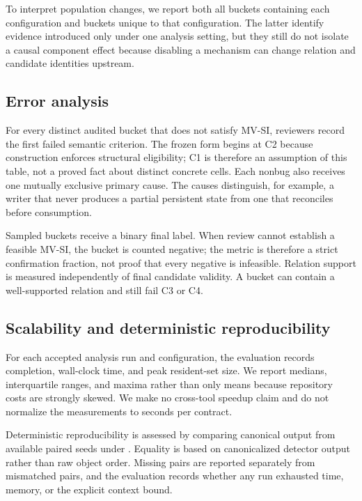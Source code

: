 To interpret population changes, we report both all buckets containing each configuration and buckets unique to that configuration. The latter identify evidence introduced only under one analysis setting, but they still do not isolate a causal component effect because disabling a mechanism can change relation and candidate identities upstream.

\subsection{Error analysis}
\label{s:evaluation-error-protocol}

For every distinct audited bucket that does not satisfy MV-SI, reviewers record the first failed semantic criterion. The frozen form begins at C2 because construction enforces structural eligibility; C1 is therefore an assumption of this table, not a proved fact about distinct concrete cells. Each nonbug also receives one mutually exclusive primary cause. The causes distinguish, for example, a writer that never produces a partial persistent state from one that reconciles before consumption.

Sampled buckets receive a binary final label. When review cannot establish a feasible MV-SI, the bucket is counted negative; the metric is therefore a strict confirmation fraction, not proof that every negative is infeasible. Relation support is measured independently of final candidate validity. A bucket can contain a well-supported relation and still fail C3 or C4.

\subsection{Scalability and deterministic reproducibility}
\label{s:evaluation-performance-protocol}

For each accepted analysis run and configuration, the evaluation records completion, wall-clock time, and peak resident-set size. We report medians, interquartile ranges, and maxima rather than only means because repository costs are strongly skewed. We make no cross-tool speedup claim and do not normalize the measurements to seconds per contract.

Deterministic reproducibility is assessed by comparing canonical output from available paired seeds under . Equality is based on canonicalized detector output rather than raw object order. Missing pairs are reported separately from mismatched pairs, and the evaluation records whether any run exhausted time, memory, or the explicit context bound.
